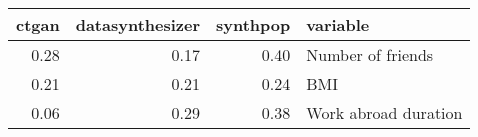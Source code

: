 \begin{tabular}{rrrl}
  \toprule
ctgan & datasynthesizer & synthpop & variable \\ 
  \midrule
0.28 & 0.17 & 0.40 & Number of friends \\ 
  0.21 & 0.21 & 0.24 & BMI \\ 
  0.06 & 0.29 & 0.38 & Work abroad duration \\ 
   \bottomrule
\end{tabular}
